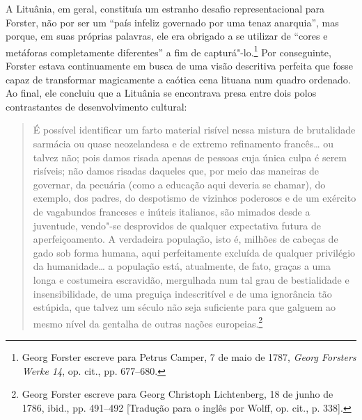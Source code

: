 \asterisc

A Lituânia, em geral, constituía um estranho desafio representacional
para Forster, não por ser um ``país infeliz governado por uma tenaz
anarquia'', mas porque, em suas próprias palavras, ele era obrigado a se
utilizar de ``cores e metáforas completamente diferentes'' a fim de
capturá"-lo.\footnote{Georg Forster escreve para Petrus Camper, 7 de maio de 1787, \textit{Georg Forsters Werke 14}, op. cit., pp. 677--680.} Por conseguinte, Forster estava continuamente em busca de uma visão
descritiva perfeita que fosse capaz de transformar magicamente a caótica
cena lituana num quadro ordenado. Ao final, ele concluiu que a Lituânia
se encontrava presa entre dois polos contrastantes de desenvolvimento
cultural:

\begin{quote}
É possível identificar um farto material risível nessa mistura de
brutalidade sarmácia ou quase neozelandesa e de extremo refinamento
francês\ldots{} ou talvez não; pois damos risada apenas de pessoas cuja
única culpa é serem risíveis; não damos risadas daqueles que, por meio
das maneiras de governar, da pecuária (como a educação aqui deveria se
chamar), do exemplo, dos padres, do despotismo de vizinhos poderosos e
de um exército de vagabundos franceses e inúteis italianos, são mimados
desde a juventude, vendo"-se desprovidos de qualquer expectativa futura
de aperfeiçoamento. A verdadeira população, isto é, milhões de cabeças
de gado sob forma humana, aqui perfeitamente excluída de qualquer
privilégio da humanidade\ldots{} a população está, atualmente, de fato,
graças a uma longa e costumeira escravidão, mergulhada num tal grau de
bestialidade e insensibilidade, de uma preguiça indescritível e de uma
ignorância tão estúpida, que talvez um século não seja suficiente para
que galguem ao mesmo nível da gentalha de outras nações
europeias.\footnote{Georg Forster escreve para Georg Christoph Lichtenberg, 18 de junho de 1786, ibid., pp. 491--492 [Tradução para o inglês por Wolff, op. cit., p. 338].}
\end{quote}

